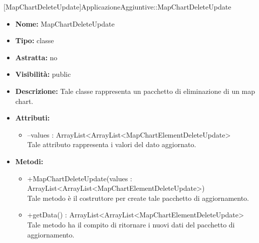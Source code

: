 			[MapChartDeleteUpdate]{ApplicazioneAggiuntive::MapChartDeleteUpdate}
			

	
			
			\begin{itemize}
			\item \textbf{Nome:} MapChartDeleteUpdate
			\item \textbf{Tipo:} classe
			
		\item \textbf{Astratta:}
		no
			\item \textbf{Visibilità:} public
			\item \textbf{Descrizione:} Tale classe rappresenta un pacchetto di eliminazione di un map chart.
			\item \textbf{Attributi:}
				\begin{itemize}
				\setlength{\itemsep}{5pt}
				
					\item[\ding{111}] {--values : ArrayList<ArrayList<MapChartElementDeleteUpdate>} \\ [1mm] Tale attributo rappresenta i valori del dato aggiornato.
				\end{itemize}
		
			\item \textbf{Metodi:}
				\begin{itemize}
				\setlength{\itemsep}{5pt}
				
					\item[\ding{111}] {{+MapChartDeleteUpdate(values : ArrayList<ArrayList<MapChartElementDeleteUpdate>)}} \\ [1mm] Tale metodo è il costruttore per create tale pacchetto di aggiornamento.
					\item[\ding{111}] {{+getData() : ArrayList<ArrayList<MapChartElementDeleteUpdate>}} \\ [1mm] Tale metodo ha il compito di ritornare i nuovi dati del pacchetto di aggiornamento.
				\end{itemize}
		
			\end{itemize}
	
